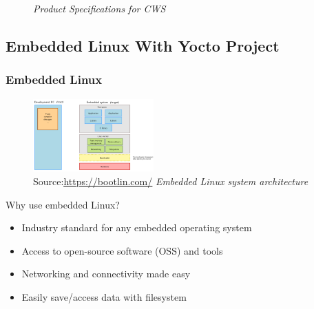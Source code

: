 \documentclass[8pt,compress]{beamer}
\begin{document}
\begin{frame}
\begin{minipage}{0.50\textwidth}
\begin{figure}
            \caption{\it Product Specifications for CWS}
        \end{figure}
        \vspace{0.2cm}
    \end{minipage}
\end{frame}
\subsection{Embedded Linux With Yocto Project}
\begin{frame}
  \frametitle{Embedded Linux}
  \begin{figure}
    \includegraphics[width=175px]{assets/diagrams/embedded_linux.png}
    \centering
    \caption{\tiny Source:\underline{\href{https://bootlin.com/}{https://bootlin.com/}}\hspace{\textwidth}
    \textit{Embedded Linux system architecture}}
  \end{figure}
  \vspace{-16px}
  \begin{block}{Why use embedded Linux?}
    \small{
      \begin{itemize}
        \item Industry standard for any embedded operating system
        \item Access to open-source software (OSS) and tools
        \item Networking and connectivity made easy 
        \item Easily save/access data with filesystem
      \end{itemize}
    }
  \end{block}
\end{frame}
\end{document}
